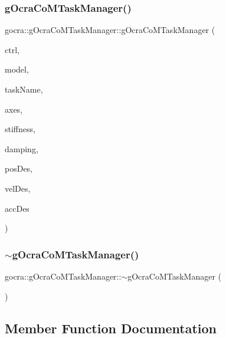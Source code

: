 \subsubsection{\texorpdfstring{g\+Ocra\+Co\+M\+Task\+Manager()}{gOcraCoMTaskManager()}\hspace{0.1cm}{\footnotesize\ttfamily [3/3]}}
{\footnotesize\ttfamily gocra\+::g\+Ocra\+Co\+M\+Task\+Manager\+::g\+Ocra\+Co\+M\+Task\+Manager (\begin{DoxyParamCaption}\item[{\hyperlink{classgocra_1_1GHCJTController}{G\+H\+C\+J\+T\+Controller} \&}]{ctrl,  }\item[{const ocra\+::\+Model \&}]{model,  }\item[{const std\+::string \&}]{task\+Name,  }\item[{\hyperlink{namespaceocra_a436781c7059a0f76027df1c652126260}{ocra\+::\+E\+Cartesian\+Dof}}]{axes,  }\item[{double}]{stiffness,  }\item[{double}]{damping,  }\item[{Eigen\+::\+Vector3d}]{pos\+Des,  }\item[{Eigen\+::\+Vector3d}]{vel\+Des,  }\item[{Eigen\+::\+Vector3d}]{acc\+Des }\end{DoxyParamCaption})}

\hypertarget{classgocra_1_1gOcraCoMTaskManager_ae1de7bee1de0ccd0b904baccdd4ca9c0}{}\label{classgocra_1_1gOcraCoMTaskManager_ae1de7bee1de0ccd0b904baccdd4ca9c0} 
\subsubsection{\texorpdfstring{$\sim$g\+Ocra\+Co\+M\+Task\+Manager()}{~gOcraCoMTaskManager()}}
{\footnotesize\ttfamily gocra\+::g\+Ocra\+Co\+M\+Task\+Manager\+::$\sim$g\+Ocra\+Co\+M\+Task\+Manager (\begin{DoxyParamCaption}{ }\end{DoxyParamCaption})}



\subsection{Member Function Documentation}
\hypertarget{classgocra_1_1gOcraCoMTaskManager_a0a2649bf8ce377a8af44e13a3571f670}{}\label{classgocra_1_1gOcraCoMTaskManager_a0a2649bf8ce377a8af44e13a3571f670} 
